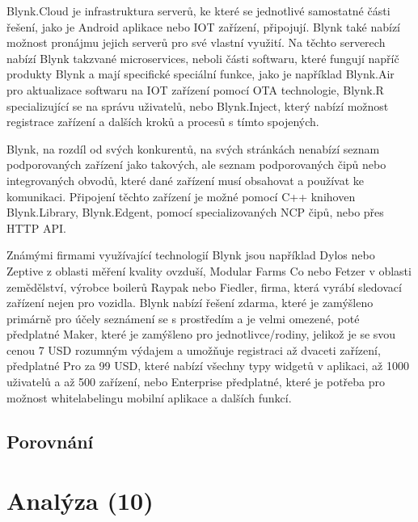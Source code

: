 Blynk.Cloud je infrastruktura serverů, ke které se jednotlivé samostatné části řešení, jako je Android aplikace nebo IOT zařízení, připojují. Blynk také nabízí možnost pronájmu jejich serverů pro své vlastní využití. Na těchto serverech nabízí Blynk takzvané microservices, neboli části softwaru, které fungují napříč produkty Blynk a mají specifické speciální funkce, jako je například Blynk.Air pro aktualizace softwaru na IOT zařízení pomocí OTA technologie, Blynk.R specializující se na správu uživatelů, nebo Blynk.Inject, který nabízí možnost registrace zařízení a dalších kroků a procesů s tímto spojených.

Blynk, na rozdíl od svých konkurentů, na svých stránkách nenabízí seznam podporovaných zařízení jako takových, ale seznam podporovaných čipů nebo integrovaných obvodů, které dané zařízení musí obsahovat a používat ke komunikaci. Připojení těchto zařízení je možné pomocí C++ knihoven Blynk.Library, Blynk.Edgent, pomocí specializovaných NCP čipů, nebo přes HTTP API.

Známými firmami využívající technologií Blynk jsou například Dylos nebo Zeptive z oblasti měření kvality ovzduší, Modular Farms Co nebo Fetzer v oblasti zemědělství, výrobce boilerů Raypak nebo Fiedler, firma, která vyrábí sledovací zařízení nejen pro vozidla.
Blynk nabízí řešení zdarma, které je zamýšleno primárně pro účely seznámení se s prostředím a je velmi omezené, poté předplatné Maker, které je zamýšleno pro jednotlivce/rodiny, jelikož je se svou cenou 7 USD rozumným výdajem a umožňuje registraci až dvaceti zařízení, předplatné Pro za 99 USD, které nabízí všechny typy widgetů v aplikaci, až 1000 uživatelů a až 500 zařízení, nebo Enterprise předplatné, které je potřeba pro možnost whitelabelingu mobilní aplikace a dalších funkcí.


\section{Porovnání}

\chapter{Analýza (10)}

